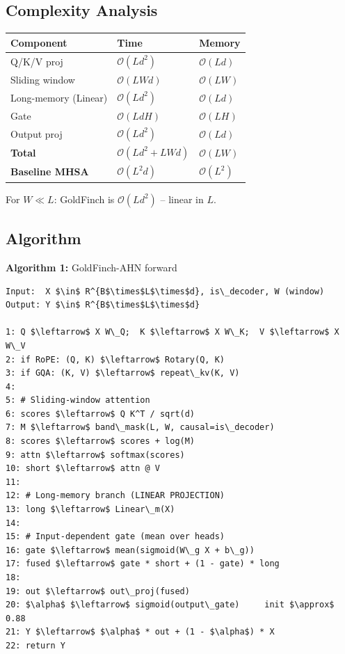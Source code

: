 \subsection{Complexity Analysis}

\begin{table}[H]
\centering
\small
\begin{tabular}{lll}
\toprule
\textbf{Component} & \textbf{Time} & \textbf{Memory} \\
\midrule
Q/K/V proj & $\mathcal{O}(Ld^2)$ & $\mathcal{O}(Ld)$ \\
Sliding window & $\mathcal{O}(LWd)$ & $\mathcal{O}(LW)$ \\
Long-memory (Linear) & $\mathcal{O}(Ld^2)$ & $\mathcal{O}(Ld)$ \\
Gate & $\mathcal{O}(LdH)$ & $\mathcal{O}(LH)$ \\
Output proj & $\mathcal{O}(Ld^2)$ & $\mathcal{O}(Ld)$ \\
\textbf{Total} & $\mathcal{O}(Ld^2 + LWd)$ & $\mathcal{O}(LW)$ \\
\textbf{Baseline MHSA} & $\mathcal{O}(L^2 d)$ & $\mathcal{O}(L^2)$ \\
\bottomrule
\end{tabular}
\end{table}

For $W \ll L$: GoldFinch is $\mathcal{O}(L d^2)$ -- linear in $L$.

\subsection{Algorithm}

\textbf{Algorithm 1:} GoldFinch-AHN forward
\begin{lstlisting}
Input:  X $\in$ R^{B$\times$L$\times$d}, is\_decoder, W (window)
Output: Y $\in$ R^{B$\times$L$\times$d}

1: Q $\leftarrow$ X W\_Q;  K $\leftarrow$ X W\_K;  V $\leftarrow$ X W\_V
2: if RoPE: (Q, K) $\leftarrow$ Rotary(Q, K)
3: if GQA: (K, V) $\leftarrow$ repeat\_kv(K, V)
4:
5: # Sliding-window attention
6: scores $\leftarrow$ Q K^T / sqrt(d)
7: M $\leftarrow$ band\_mask(L, W, causal=is\_decoder)
8: scores $\leftarrow$ scores + log(M)
9: attn $\leftarrow$ softmax(scores)
10: short $\leftarrow$ attn @ V
11:
12: # Long-memory branch (LINEAR PROJECTION)
13: long $\leftarrow$ Linear\_m(X)
14:
15: # Input-dependent gate (mean over heads)
16: gate $\leftarrow$ mean(sigmoid(W\_g X + b\_g))
17: fused $\leftarrow$ gate * short + (1 - gate) * long
18:
19: out $\leftarrow$ out\_proj(fused)
20: $\alpha$ $\leftarrow$ sigmoid(output\_gate)     init $\approx$ 0.88
21: Y $\leftarrow$ $\alpha$ * out + (1 - $\alpha$) * X
22: return Y
\end{lstlisting}

